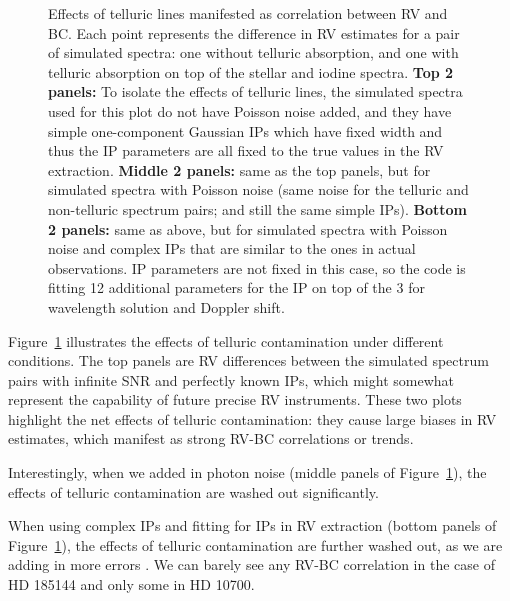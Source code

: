 \begin{figure}
\caption{Effects of telluric lines manifested as correlation between
  RV and BC. Each point represents the difference in RV estimates for
  a pair of simulated spectra: one without telluric absorption, and
  one with telluric absorption on top of the stellar and iodine
  spectra. {\bf Top 2 panels:} To isolate the effects of telluric
  lines, the simulated spectra used for this plot do not have Poisson
  noise added, and they have simple one-component Gaussian IPs which
  have fixed width and thus the IP parameters are all fixed to the
  true values in the RV extraction. {\bf Middle 2 panels:} same as the
  top panels, but for simulated spectra with Poisson noise (same noise
  for the telluric and non-telluric spectrum pairs; and still the same
  simple IPs). {\bf Bottom 2 panels:} same as above, but for simulated
  spectra with Poisson noise and complex IPs that are similar to the
  ones in actual observations. IP parameters are not fixed in this
  case, so the code is fitting 12 additional parameters for the IP on
  top of the 3 for wavelength solution and Doppler shift.
\label{fig:sim}}
\end{figure}

Figure~\ref{fig:sim} illustrates the effects of telluric
contamination under different conditions. The top panels are RV
differences between the simulated spectrum pairs with infinite SNR and
perfectly known IPs, which might somewhat represent the capability of
future precise RV instruments. These two plots highlight the net
effects of telluric contamination: they cause large biases in RV
estimates, which manifest as strong RV-BC correlations or
trends. 

Interestingly, when we added in photon noise (middle panels of
Figure~\ref{fig:sim}), the effects of telluric contamination
are washed out significantly. 

When using complex IPs and fitting for IPs in RV extraction (bottom
panels of Figure~\ref{fig:sim}), the effects of telluric
contamination are further washed out, as we are adding in more errors
. We can
barely see any RV-BC correlation in the case of HD 185144 and only
some in HD 10700.

